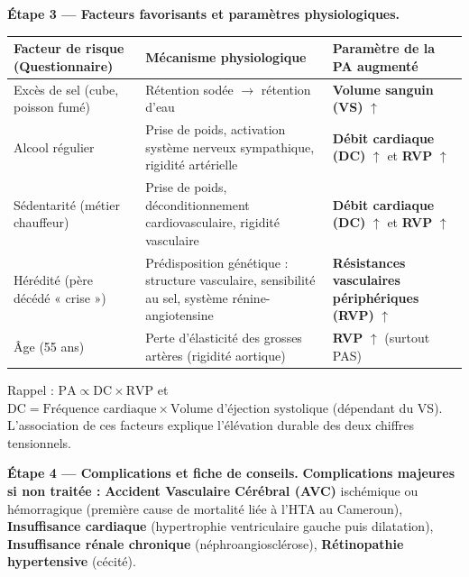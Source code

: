 \documentclass[11pt]{article}
\begin{document}
\begin{exoresolu}
\textbf{Étape 3 — Facteurs favorisants et paramètres physiologiques.}
\begin{center}
\begin{tabularx}{\linewidth}{|l|X|X|}
\hline
\rowcolor{popblueL} Facteur de risque (Questionnaire) & Mécanisme physiologique & Paramètre de la PA augmenté \\
\hline Excès de sel (cube, poisson fumé) & Rétention sodée $\rightarrow$ rétention d'eau & \textbf{Volume sanguin (VS)} $\uparrow$ \\
\hline Alcool régulier & Prise de poids, activation système nerveux sympathique, rigidité artérielle & \textbf{Débit cardiaque (DC)} $\uparrow$ et \textbf{RVP} $\uparrow$ \\
\hline Sédentarité (métier chauffeur) & Prise de poids, déconditionnement cardiovasculaire, rigidité vasculaire & \textbf{Débit cardiaque (DC)} $\uparrow$ et \textbf{RVP} $\uparrow$ \\
\hline Hérédité (père décédé « crise ») & Prédisposition génétique : structure vasculaire, sensibilité au sel, système rénine-angiotensine & \textbf{Résistances vasculaires périphériques (RVP)} $\uparrow$ \\
\hline Âge (55 ans) & Perte d'élasticité des grosses artères (rigidité aortique) & \textbf{RVP} $\uparrow$ (surtout PAS) \\
\hline
\end{tabularx}
\end{center}
Rappel : $\text{PA} \propto \text{DC} \times \text{RVP}$ et $\text{DC} = \text{Fréquence cardiaque} \times \text{Volume d'éjection systolique}$ (dépendant du VS). L'association de ces facteurs explique l'élévation durable des deux chiffres tensionnels.

\textbf{Étape 4 — Complications et fiche de conseils.}
\textbf{Complications majeures si non traitée :} \textbf{Accident Vasculaire Cérébral (AVC)} ischémique ou hémorragique (première cause de mortalité liée à l'HTA au Cameroun), \textbf{Insuffisance cardiaque} (hypertrophie ventriculaire gauche puis dilatation), \textbf{Insuffisance rénale chronique} (néphroangiosclérose), \textbf{Rétinopathie hypertensive} (cécité).


\end{exoresolu}
\end{document}
